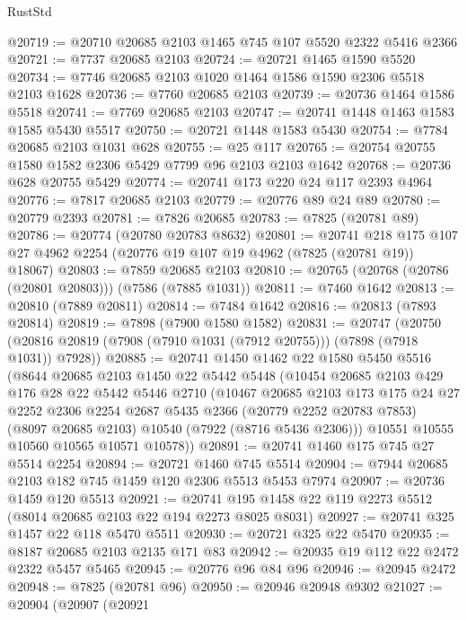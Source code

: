 \begin{lexlean}{RustStd}
\begin{coremodule}
@20719 := @20710 @20685 @2103 @1465 @745 @107 @5520 @2322 @5416 @2366
@20721 := @7737 @20685 @2103
@20724 := @20721 @1465 @1590 @5520
@20734 := @7746 @20685 @2103 @1020 @1464 @1586 @1590 @2306 @5518 @2103 @1628
@20736 := @7760 @20685 @2103
@20739 := @20736 @1464 @1586 @5518
@20741 := @7769 @20685 @2103
@20747 := @20741 @1448 @1463 @1583 @1585 @5430 @5517
@20750 := @20721 @1448 @1583 @5430
@20754 := @7784 @20685 @2103 @1031 @628
@20755 := @25 @117
@20765 := @20754 @20755 @1580 @1582 @2306 @5429 @7799 @96 @2103 @2103 @1642
@20768 := @20736 @628 @20755 @5429
@20774 := @20741 @173 @220 @24 @117 @2393 @4964
@20776 := @7817 @20685 @2103
@20779 := @20776 @89 @24 @89
@20780 := @20779 @2393
@20781 := @7826 @20685
@20783 := @7825 (@20781 @89)
@20786 := @20774 (@20780 @20783 @8632)
@20801 := @20741
    @218
    @175
    @107
    @27
    @4962
    @2254
    (@20776 @19 @107 @19 @4962 (@7825 (@20781 @19)) @18067)
@20803 := @7859 @20685 @2103
@20810 := @20765 (@20768 (@20786 (@20801 @20803))) (@7586 (@7885 @1031))
@20811 := @7460 @1642
@20813 := @20810 (@7889 @20811)
@20814 := @7484 @1642
@20816 := @20813 (@7893 @20814)
@20819 := @7898 (@7900 @1580 @1582)
@20831 := @20747
    (@20750 (@20816 @20819 (@7908 (@7910 @1031 (@7912 @20755))) (@7898 (@7918 @1031)) @7928))
@20885 := @20741
    @1450
    @1462
    @22
    @1580
    @5450
    @5516
    (@8644
      @20685
      @2103
      @1450
      @22
      @5442
      @5448
      (@10454
        @20685
        @2103
        @429
        @176
        @28
        @22
        @5442
        @5446
        @2710
        (@10467
          @20685
          @2103
          @173
          @175
          @24
          @27
          @2252
          @2306
          @2254
          @2687
          @5435
          @2366
          (@20779 @2252 @20783 @7853)
          (@8097 @20685 @2103)
          @10540
          (@7922 (@8716 @5436 @2306)))
        @10551
        @10555
        @10560
        @10565
        @10571
        @10578))
@20891 := @20741 @1460 @175 @745 @27 @5514 @2254
@20894 := @20721 @1460 @745 @5514
@20904 := @7944 @20685 @2103 @182 @745 @1459 @120 @2306 @5513 @5453 @7974
@20907 := @20736 @1459 @120 @5513
@20921 := @20741 @195 @1458 @22 @119 @2273 @5512 (@8014 @20685 @2103 @22 @194 @2273 @8025 @8031)
@20927 := @20741 @325 @1457 @22 @118 @5470 @5511
@20930 := @20721 @325 @22 @5470
@20935 := @8187 @20685 @2103 @2135 @171 @83
@20942 := @20935 @19 @112 @22 @2472 @2322 @5457 @5465
@20945 := @20776 @96 @84 @96
@20946 := @20945 @2472
@20948 := @7825 (@20781 @96)
@20950 := @20946 @20948 @9302
@21027 := @20904
    (@20907
      (@20921

\end{coremodule}
\end{lexlean}
